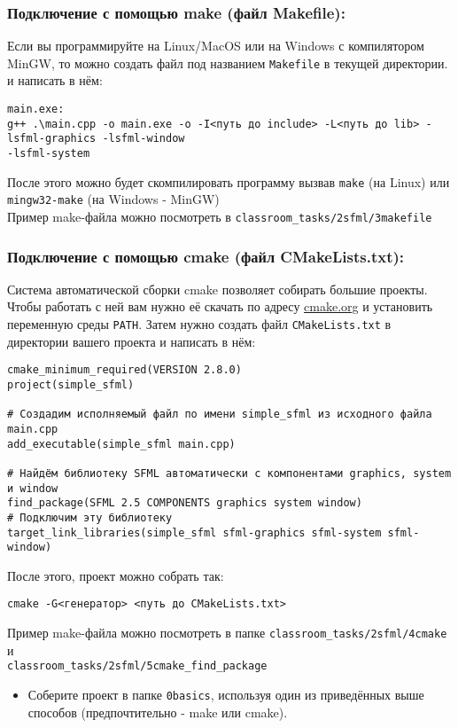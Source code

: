 \documentclass{article}
\begin{document}
\subsubsection*{Подключение с помощью make (файл Makefile):}
Если вы программируйте на Linux/MacOS или на Windows с компилятором MinGW, то можно создать файл под названием \texttt{Makefile} в текущей директории. и написать в нём:
\begin{verbatim}
main.exe:
g++ .\main.cpp -o main.exe -o -I<путь до include> -L<путь до lib> -lsfml-graphics -lsfml-window 
-lsfml-system
\end{verbatim}
После этого можно будет скомпилировать программу вызвав \texttt{make} (на Linux) или \texttt{mingw32-make} (на Windows - MinGW)\\
Пример make-файла можно посмотреть в \texttt{classroom\_tasks/2sfml/3makefile}
\subsubsection*{Подключение с помощью cmake (файл CMakeLists.txt):}
Система автоматической сборки cmake позволяет собирать большие проекты. Чтобы работать с ней вам нужно её скачать по адресу \href{https://cmake.org/}{cmake.org} и установить переменную среды \texttt{PATH}. Затем нужно создать файл \texttt{CMakeLists.txt} в директории вашего проекта и написать в нём:
\begin{verbatim}
cmake_minimum_required(VERSION 2.8.0)
project(simple_sfml)
 
# Создадим исполняемый файл по имени simple_sfml из исходного файла main.cpp
add_executable(simple_sfml main.cpp)

# Найдём библиотеку SFML автоматически с компонентами graphics, system и window
find_package(SFML 2.5 COMPONENTS graphics system window)
# Подключим эту библиотеку
target_link_libraries(simple_sfml sfml-graphics sfml-system sfml-window)
\end{verbatim}

После этого, проект можно собрать так:
\begin{verbatim}
cmake -G<генератор> <путь до CMakeLists.txt>
\end{verbatim}

Пример make-файла можно посмотреть в папке \texttt{classroom\_tasks/2sfml/4cmake} и\\ \texttt{classroom\_tasks/2sfml/5cmake\_find\_package}\\
\begin{itemize}
\item Соберите проект в папке \texttt{0basics}, используя один из приведённых выше способов (предпочтительно - make или cmake). 
\end{itemize}
\newpage
\end{document}
